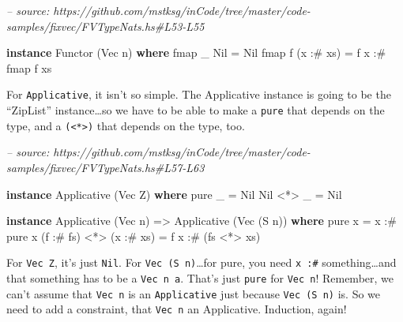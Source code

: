 \documentclass[]{article}
\newenvironment{Shaded}{}{}
\newcommand{\CommentTok}[1]{\textcolor[rgb]{0.38,0.63,0.69}{\textit{#1}}}
\newcommand{\DataTypeTok}[1]{\textcolor[rgb]{0.56,0.13,0.00}{#1}}
\newcommand{\FunctionTok}[1]{\textcolor[rgb]{0.02,0.16,0.49}{#1}}
\newcommand{\KeywordTok}[1]{\textcolor[rgb]{0.00,0.44,0.13}{\textbf{#1}}}
\newcommand{\NormalTok}[1]{#1}
\newcommand{\OtherTok}[1]{\textcolor[rgb]{0.00,0.44,0.13}{#1}}
\begin{document}
\begin{Shaded}
\begin{Highlighting}[]
\CommentTok{-- source: https://github.com/mstksg/inCode/tree/master/code-samples/fixvec/FVTypeNats.hs#L53-L55}

\KeywordTok{instance} \DataTypeTok{Functor}\NormalTok{ (}\DataTypeTok{Vec}\NormalTok{ n) }\KeywordTok{where}
\NormalTok{    fmap _ }\DataTypeTok{Nil}       \FunctionTok{=} \DataTypeTok{Nil}
\NormalTok{    fmap f (x }\FunctionTok{:#}\NormalTok{ xs) }\FunctionTok{=}\NormalTok{ f x }\FunctionTok{:#}\NormalTok{ fmap f xs}
\end{Highlighting}
\end{Shaded}

For \texttt{Applicative}, it isn't so simple. The Applicative instance is going
to be the ``ZipList'' instance\ldots{}so we have to be able to make a
\texttt{pure} that depends on the type, and a
\texttt{(\textless{}*\textgreater{})} that depends on the type, too.

\begin{Shaded}
\begin{Highlighting}[]
\CommentTok{-- source: https://github.com/mstksg/inCode/tree/master/code-samples/fixvec/FVTypeNats.hs#L57-L63}

\KeywordTok{instance} \DataTypeTok{Applicative}\NormalTok{ (}\DataTypeTok{Vec} \DataTypeTok{Z}\NormalTok{) }\KeywordTok{where}
\NormalTok{    pure _    }\FunctionTok{=} \DataTypeTok{Nil}
    \DataTypeTok{Nil} \FunctionTok{<*>}\NormalTok{ _ }\FunctionTok{=} \DataTypeTok{Nil}

\KeywordTok{instance} \DataTypeTok{Applicative}\NormalTok{ (}\DataTypeTok{Vec}\NormalTok{ n) }\OtherTok{=>} \DataTypeTok{Applicative}\NormalTok{ (}\DataTypeTok{Vec}\NormalTok{ (}\DataTypeTok{S}\NormalTok{ n)) }\KeywordTok{where}
\NormalTok{    pure x }\FunctionTok{=}\NormalTok{ x }\FunctionTok{:#}\NormalTok{ pure x}
\NormalTok{    (f }\FunctionTok{:#}\NormalTok{ fs) }\FunctionTok{<*>}\NormalTok{ (x }\FunctionTok{:#}\NormalTok{ xs) }\FunctionTok{=}\NormalTok{ f x }\FunctionTok{:#}\NormalTok{ (fs }\FunctionTok{<*>}\NormalTok{ xs)}
\end{Highlighting}
\end{Shaded}

For \texttt{Vec\ Z}, it's just \texttt{Nil}. For \texttt{Vec\ (S\ n)}\ldots{}for
pure, you need \texttt{x\ :\#} something\ldots{}and that something has to be a
\texttt{Vec\ n\ a}. That's just \texttt{pure} for \texttt{Vec\ n}! Remember, we
can't assume that \texttt{Vec\ n} is an \texttt{Applicative} just because
\texttt{Vec\ (S\ n)} is. So we need to add a constraint, that \texttt{Vec\ n} an
Applicative. Induction, again!
\end{document}
